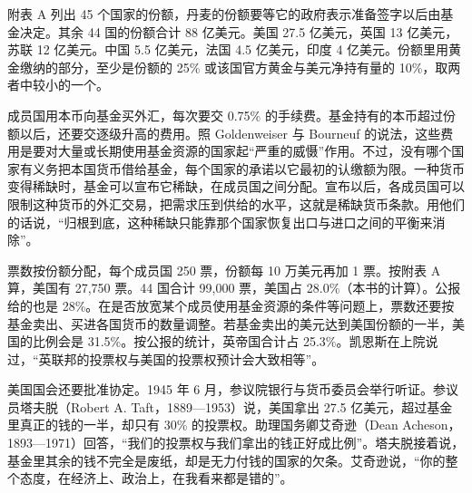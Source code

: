 附表 A 列出 45 个国家的份额，丹麦的份额要等它的政府表示准备签字以后由基金决定\cite{bw1944}。其余 44 国的份额合计 88 亿美元\cite{bw1944,frb1944}。美国 27.5 亿美元，英国 13 亿美元，苏联 12 亿美元\cite{bw1944}。中国 5.5 亿美元，法国 4.5 亿美元，印度 4 亿美元\cite{bw1944}。份额里用黄金缴纳的部分，至少是份额的 25\% 或该国官方黄金与美元净持有量的 10\%，取两者中较小的一个\cite{frb1944}。

成员国用本币向基金买外汇，每次要交 0.75\% 的手续费\cite{frb1944}。基金持有的本币超过份额以后，还要交逐级升高的费用。照 Goldenweiser 与 Bourneuf 的说法，这些费用是要对大量或长期使用基金资源的国家起“严重的威慑”作用\cite{frb1944}。不过，没有哪个国家有义务把本国货币借给基金，每个国家的承诺以它最初的认缴额为限\cite{frb1944}。一种货币变得稀缺时，基金可以宣布它稀缺，在成员国之间分配\cite{frb1944}。宣布以后，各成员国可以限制这种货币的外汇交易，把需求压到供给的水平，这就是稀缺货币条款\cite{frb1944}。用他们的话说，“归根到底，这种稀缺只能靠那个国家恢复出口与进口之间的平衡来消除”\cite{frb1944}。

票数按份额分配，每个成员国 250 票，份额每 10 万美元再加 1 票\cite{frb1944}。按附表 A 算，美国有 27,750 票。44 国合计 99,000 票，美国占 28.0\%（本书的计算）\cite{bw1944}。公报给的也是 28\%\cite{frb1944}。在是否放宽某个成员使用基金资源的条件等问题上，票数还要按基金卖出、买进各国货币的数量调整\cite{frb1944}。若基金卖出的美元达到美国份额的一半，美国的比例会是 31.5\%\cite{frb1944}。按公报的统计，英帝国合计占 25.3\%\cite{frb1944}。凯恩斯在上院说过，“英联邦的投票权与美国的投票权预计会大致相等”\cite{hansard1944}。


美国国会还要批准协定。1945 年 6 月，参议院银行与货币委员会举行听证\cite{senate1945}。参议员塔夫脱（Robert A. Taft，1889—1953）说，美国拿出 27.5 亿美元，超过基金里真正的钱的一半，却只有 30\% 的投票权\cite{senate1945,loc34}。助理国务卿艾奇逊（Dean Acheson，1893—1971）回答，“我们的投票权与我们拿出的钱正好成比例”\cite{senate1945,loc34}。塔夫脱接着说，基金里其余的钱不完全是废纸，却是无力付钱的国家的欠条\cite{senate1945}。艾奇逊说，“你的整个态度，在经济上、政治上，在我看来都是错的”\cite{senate1945}。

